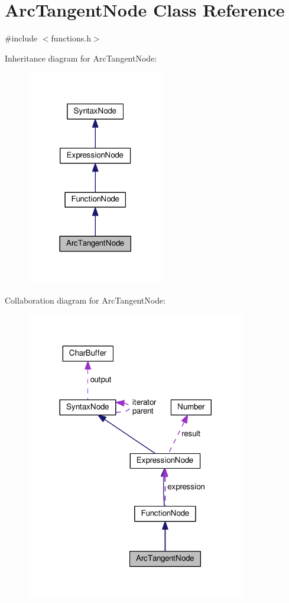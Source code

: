 \hypertarget{classArcTangentNode}{}\section{Arc\+Tangent\+Node Class Reference}
\label{classArcTangentNode}


{\ttfamily \#include $<$functions.\+h$>$}



Inheritance diagram for Arc\+Tangent\+Node\+:
\nopagebreak
\begin{figure}[H]
\begin{center}
\leavevmode
\includegraphics[width=170pt]{d8/dac/classArcTangentNode__inherit__graph}
\end{center}
\end{figure}


Collaboration diagram for Arc\+Tangent\+Node\+:
\nopagebreak
\begin{figure}[H]
\begin{center}
\leavevmode
\includegraphics[width=272pt]{d4/dad/classArcTangentNode__coll__graph}
\end{center}
\end{figure}
